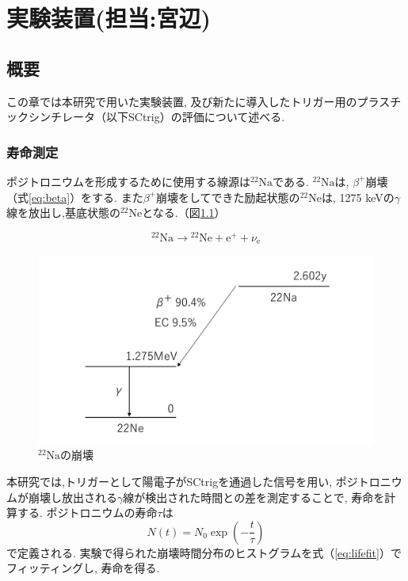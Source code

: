 \chapter{実験装置(担当:宮辺)}
\label{apparatus}

\section{概要}

この章では本研究で用いた実験装置,
及び新たに導入したトリガー用のプラスチックシンチレータ（以下SCtrig）の評価について述べる.


\subsection{寿命測定}

ポジトロニウムを形成するために使用する線源は$\mathrm{^{22}Na}$である.
$\mathrm{^{22}Na}$は,
$\beta^{+}$崩壊（式\ref{eq:beta}）をする.
また$\beta^{+}$崩壊をしてできた励起状態の$\mathrm{^{22}Ne}$は,
1275 keVの$\gamma$線を放出し,基底状態の$\mathrm{^{22}Ne}$となる.（図\ref{fig:na}）

\begin{equation}
\mathrm{^{22}Na} \to \mathrm{^{22}Ne} + \mathrm{e^{+}} + \nu_{\mathrm{e}}
\label{eq:beta}
\end{equation}

\begin{figure}[H]
\centering
\includegraphics[keepaspectratio,scale=0.4]{fig/ybm/na.pdf}
\caption{$\mathrm{^{22}Na}$の崩壊}
\label{fig:na}
\end{figure}

本研究では,トリガーとして陽電子がSCtrigを通過した信号を用い,
ポジトロニウムが崩壊し放出される$\gamma$線が検出された時間との差を測定することで,
寿命を計算する.
ポジトロニウムの寿命$\tau$は
\begin{equation}
N(t) = N_{0} \exp( - \frac{t}{\tau})
\label{eq:lifefit}
\end{equation}
で定義される.
実験で得られた崩壊時間分布のヒストグラムを式（\ref{eq:lifefit}）でフィッティングし,
寿命を得る.


